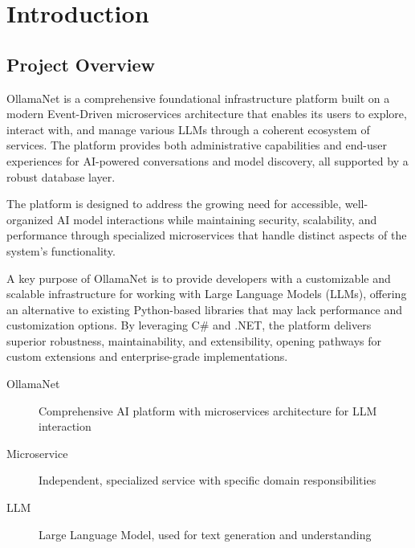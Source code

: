 \def\chapdir{./ChapterIntro}

\chapter{Introduction} \label{ch:intro}

\section{Project Overview}

OllamaNet is a comprehensive foundational infrastructure platform built on a modern Event-Driven microservices architecture that enables its users to explore, interact with, and manage various LLMs through a coherent ecosystem of services. The platform provides both administrative capabilities and end-user experiences for AI-powered conversations and model discovery, all supported by a robust database layer.

The platform is designed to address the growing need for accessible, well-organized AI model interactions while maintaining security, scalability, and performance through specialized microservices that handle distinct aspects of the system's functionality.

A key purpose of OllamaNet is to provide developers with a customizable and scalable infrastructure for working with Large Language Models (LLMs), offering an alternative to existing Python-based libraries that may lack performance and customization options. By leveraging C\# and .NET, the platform delivers superior robustness, maintainability, and extensibility, opening pathways for custom extensions and enterprise-grade implementations.


\begin{terminology}
\begin{description}
\item[OllamaNet] Comprehensive AI platform with microservices architecture for LLM interaction
\item[Microservice] Independent, specialized service with specific domain responsibilities  
\item[LLM] Large Language Model, used for text generation and understanding
\end{description}
\end{terminology}

